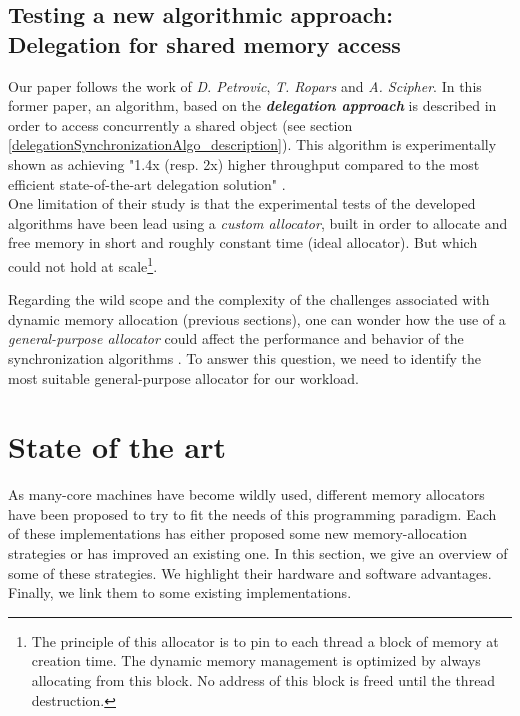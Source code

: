 \documentclass[10pt]{article}											%
\begin{document}

\subsection{Testing a new algorithmic approach: Delegation for shared memory access}
Our paper follows the work of \textit{D. Petrovic}, \textit{T. Ropars} and \textit{A. Scipher}\cite{delegationCS_roparsPetrovic}.   In this former paper, an algorithm, based on the \textbf{\textit{delegation approach}} is described in order to access concurrently a shared object (see section \ref{delegationSynchronizationAlgo_description}).   This algorithm is experimentally shown as achieving "1.4x (resp. 2x) higher throughput compared to the most efficient state-of-the-art delegation solution" \cite{delegationCS_roparsPetrovic}.\\

One limitation of their study is that the experimental tests of the developed algorithms have been lead using a \textit{custom allocator}, built in order to allocate and free memory in short and roughly constant time (ideal allocator).   But which could not hold at scale\footnote{The principle of this allocator is to pin to each thread a block of memory at creation time.   The dynamic memory management is optimized by always allocating from this block.   No address of this block is freed until the thread destruction.}.

Regarding the wild scope and the complexity of the challenges associated with dynamic memory allocation (previous sections), one can wonder how the use of a \textit{general-purpose allocator} could affect the performance and behavior of the synchronization algorithms \cite{delegationCS_roparsPetrovic}.   To answer this question, we need to identify the most suitable general-purpose allocator for our workload.







\section{State of the art}
As many-core machines have become wildly used, different memory allocators \cite{glibc_robertson,hoard_berger,scalloc_aigner,supermalloc_kuszmaul,jemalloc_evans,tcmalloc_ghemawat} have been proposed to try to fit the needs of this programming paradigm.   Each of these implementations has either proposed some new memory-allocation strategies or has improved an existing one.   In this section, we give an overview of some of these strategies.  We highlight their hardware and software advantages.  Finally,  we link them to some existing implementations.
\end{document}
